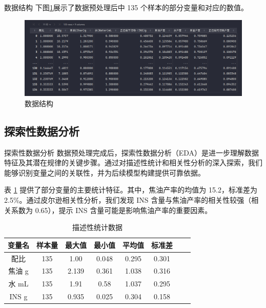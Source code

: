 \documentclass{beamer}
\begin{document}
\begin{frame}{数据结构}
    \justifying
    下图\ref{fig:dataset_structure}展示了数据预处理后中 135 个样本的部分变量和对应的数值。
    \vspace{0.3cm}
    \begin{figure}[htbp]
        \centering
        \includegraphics[width=0.9\linewidth]{pic/数据结构.png} %
        \caption{数据结构}
        \label{fig:dataset_structure}
    \end{figure}
\end{frame}

\subsection{探索性数据分析}
\begin{frame}{探索性数据分析}
    \justifying
    数据预处理完成后，探索性数据分析（EDA）是进一步理解数据特征及其潜在规律的关键步骤。通过对描述性统计和相关性分析的深入探索，我们能够识别变量之间的关联性，并为后续模型构建提供可靠依据。
    
    表 \ref{tab:descirption} 提供了部分变量的主要统计特征。其中，焦油产率的均值为 15.2，标准差为 2.5\%。通过皮尔逊相关性分析，我们发现 INS 含量与焦油产率的相关性较强（相关系数为 0.65），提示 INS 含量可能是影响焦油产率的重要因素。

    \begin{table}[htbp]
    \centering
    \caption{描述性统计数据}
    \label{tab:descirption}
    \small
    \begin{tabular}{@{}cccccccc@{}}
    \hline
    \textbf{变量名} & \textbf{样本量} & \textbf{最大值} & \textbf{最小值} & \textbf{平均值} & \textbf{标准差} \\
    \hline
    配比 & 135 & 1.00 & 0.048 & 0.295 & 0.301 \\
    焦油 g & 135 & 2.139 & 0.361 & 1.038 & 0.316 \\
    水 mL & 135 & 1.91 & 0.58 & 1.037 & 0.295 \\
    INS g & 135 & 0.935 & 0.025 & 0.304 & 0.158 \\
    \hline
    \end{tabular}
    \end{table}
\end{frame}
\end{document}

